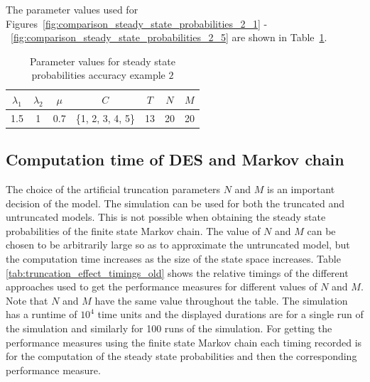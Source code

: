 The parameter values used for
Figures~\ref{fig:comparison_steady_state_probabilities_2_1}
-~\ref{fig:comparison_steady_state_probabilities_2_5} are shown in
Table~\ref{tab:parameter_set_comparison_steady_state_probabilities_2}.

\begin{table}[H]
    \centering
    \caption{Parameter values for steady state probabilities accuracy example
    \(2\)}
    \begin{tabular}{||c|c|c|c|c|c|c||}
        \hline
        \(\lambda_1\) & \(\lambda_2\) & \(\mu\) & \(C\) & \(T\) & \(N\) & \(M\) \\
        \hline
        1.5 & 1 & 0.7 & \{1, 2, 3, 4, 5\} & 13 & 20 & 20 \\
        \hline
    \end{tabular}
    \label{tab:parameter_set_comparison_steady_state_probabilities_2}
\end{table}


\subsection{Computation time of DES and Markov chain}
\label{sec:computation_time_des_markov_chain}

The choice of the artificial truncation parameters \(N\) and \(M\) is an
important decision of the model.
The simulation can be used for both the truncated and untruncated models.
This is not possible when obtaining the steady state probabilities of the
finite state Markov chain.
The value of \(N\) and \(M\) can be chosen to be arbitrarily large so as to
approximate the untruncated model, but the
computation time increases as the size of the state space increases.
Table \ref{tab:truncation_effect_timings_old} shows the relative timings of the
different approaches used to get the performance measures for different values
of \(N\) and \(M\).
Note that \(N\) and \(M\) have the same value throughout the table.
The simulation has a runtime of \(10^4\) time units and the displayed
durations are for a single run of the simulation and similarly for 100 runs of
the simulation.
For getting the performance measures using the finite state Markov chain each
timing recorded is for the computation of the steady state probabilities and
then the corresponding performance measure.

